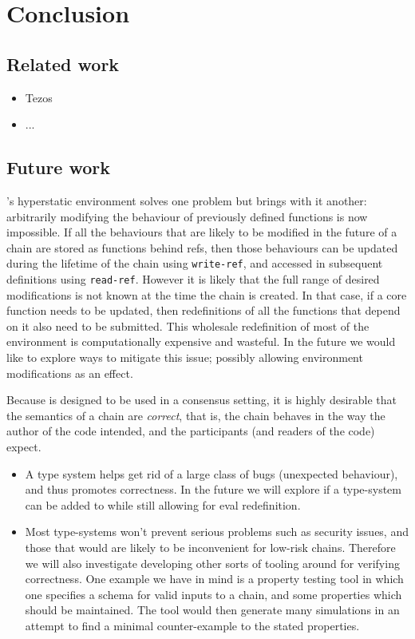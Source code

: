 \section{Conclusion}

\subsection{Related work}

\begin{itemize}
  \item Tezos
  \item ...
\end{itemize}

\subsection{Future work}

\rad's hyperstatic environment solves one problem but brings with it another:
arbitrarily modifying the behaviour of previously defined functions is now
impossible. If all the behaviours that are likely to be modified in the future of
a chain are stored as functions behind refs, then those behaviours can be
updated during the lifetime of the chain using \texttt{write-ref}, and accessed
in subsequent definitions using \texttt{read-ref}. However it is likely that the
full range of desired modifications is not known at the time the chain is
created. In that case, if a core function needs to be updated, then
redefinitions of all the functions that depend on it also need to be submitted.
This wholesale redefinition of most of the environment is computationally
expensive and wasteful. In the future we would like to explore ways to mitigate
this issue; possibly allowing environment modifications as an effect.

Because \rad{} is designed to be used in a consensus setting, it is highly
desirable that the semantics of a chain are \emph{correct}, that is, the chain
behaves in the way the author of the code intended, and the participants (and
readers of the code) expect.

\begin{itemize}
\item A type system helps get rid of a large class of bugs (unexpected
  behaviour), and thus promotes correctness. In the future we will explore if a
  type-system can be added to \rad{} while still allowing for eval redefinition.
\item Most type-systems won't prevent serious problems such as security issues,
  and those that would are likely to be inconvenient for low-risk chains.
  Therefore we will also investigate developing other sorts of tooling around
  \rad{} for verifying correctness. One example we have in mind is a property
  testing tool in which one specifies a schema for valid inputs to a chain, and
  some properties which should be maintained. The tool would then generate many
  simulations in an attempt to find a minimal counter-example to the stated
  properties.
\end{itemize}